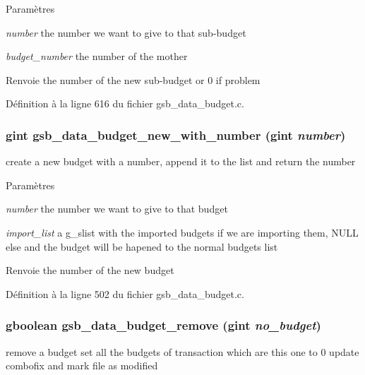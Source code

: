 \begin{DoxyParams}{Paramètres}
\item[{\em number}]the number we want to give to that sub-\/budget \item[{\em budget\_\-number}]the number of the mother\end{DoxyParams}
\begin{DoxyReturn}{Renvoie}
the number of the new sub-\/budget or 0 if problem 
\end{DoxyReturn}


Définition à la ligne 616 du fichier gsb\_\-data\_\-budget.c.

\subsubsection[{gsb\_\-data\_\-budget\_\-new\_\-with\_\-number}]{\setlength{\rightskip}{0pt plus 5cm}gint gsb\_\-data\_\-budget\_\-new\_\-with\_\-number (gint {\em number})}\label{gsb__data__budget_8h_ade0c10f8901b57f44570fc060329c7b6}
create a new budget with a number, append it to the list and return the number


\begin{DoxyParams}{Paramètres}
\item[{\em number}]the number we want to give to that budget \item[{\em import\_\-list}]a g\_\-slist with the imported budgets if we are importing them, NULL else and the budget will be hapened to the normal budgets list\end{DoxyParams}
\begin{DoxyReturn}{Renvoie}
the number of the new budget 
\end{DoxyReturn}


Définition à la ligne 502 du fichier gsb\_\-data\_\-budget.c.

\subsubsection[{gsb\_\-data\_\-budget\_\-remove}]{\setlength{\rightskip}{0pt plus 5cm}gboolean gsb\_\-data\_\-budget\_\-remove (gint {\em no\_\-budget})}\label{gsb__data__budget_8h_a895e0a12bb94ecd94095e5aab8aa05d7}
remove a budget set all the budgets of transaction which are this one to 0 update combofix and mark file as modified


